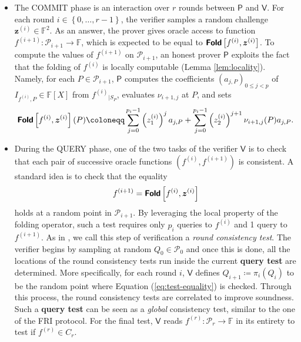 \documentclass[a4paper,USenglish,autoref]{lipics-v2021}
\newcommand\F{\mathbb{F}}
\newcommand\fold[1]{\textsf{\textbf{Fold}}\left[#1\right]}
\def\rest#1#2{{{#1}_{|#2}}}
\newcommand\prover{\mathsf{P}}
\newcommand\verifier{\mathsf{V}}
\renewcommand{\vec}[1]{\boldsymbol{#1}}
\newcommand{\set}[1]{\left\{#1\right\}}
\newcommand{\range}[1]{\set{0,\dots,#1-1}}
\newcommand\bfz{{\vec{z}}}
\newcommand\calP{\mathcal{P}}
\newcommand\mydef{\coloneqq}
\begin{document}
\begin{itemize}
	\item The \textsf{COMMIT} phase 
	is an interaction over $r$ rounds between $\prover$ and $\verifier$. For each round $i \in \range{r}$, the verifier samples a random challenge $\bfz^{(i)} \in \F^2$. As an answer, the prover gives oracle access to function $f^{(i+1)} : \calP_{i+1} \rightarrow \F$, which is expected to be equal to $\fold{f^{(i)}, \bfz^{(i)}}$. To compute the values of $f^{(i+1)}$ on $\calP_{i+1}$, an honest prover $\prover$ exploits the fact that the folding of $f^{(i)}$ is locally computable (Lemma \ref{lem:locality}). Namely, for each $P \in \calP_{i+1}$, $\prover$ computes the coefficients $(a_{j,P})_{0 \le j < p}$ of  $I_{f^{(i)}, P} \in \F[X]$ from $\rest{f^{(i)}}{S_P}$, evaluates $\nu_{i+1,j}$ at $P$, and sets 
	\[
	\fold{f^{(i)}, \bfz^{(i)}}(P) \mydef\sum_{j=0}^{p_i-1} \left(z_1^{(i)}\right)^j a_{j, P} + \sum_{j=0}^{p_i-1} \left(z_2^{(i)}\right)^{j+1} \nu_{i+1,j}(P) a_{j, P}.
	\] 
	\item During the \textsf{QUERY} phase, one of the two tasks of the verifier $\verifier$ is to check that each pair of successive oracle functions $(f^{(i)}, f^{(i+1)})$ is consistent. A standard idea is to check that the equality 
	\begin{equation}\label{eq:test-equality}
		f^{(i+1)} = \fold{f^{(i)}, \bfz^{(i)}}
	\end{equation}
	holds at a random point in $\calP_{i+ 1}$.
	By leveraging the local property of the folding operator, such a test requires only $p_i$ queries to $f^{(i)}$ and 1 query to $f^{(i + 1)}$. As in \cite{BBHR18a}, we call this step of verification a \emph{round consistency test}. The verifier begins by sampling at random $Q_0 \in \calP_0$ and once this is done, all the locations of the round consistency tests run inside the current \textsf{\textbf{query test}} are determined. More specifically, for each round $i$,  $\verifier$ defines $Q_{i+1} \mydef \pi_i(Q_i)$ to be the random point where Equation (\ref{eq:test-equality}) is checked. Through this process, the round consistency tests are correlated to improve soundness. Such a \textsf{\textbf{query test}} can be seen as a \emph{global} consistency test, similar to the one of the \textsf{FRI} protocol. For the final test, $\verifier$ reads $f^{(r)} : \calP_r \rightarrow \F$ in its entirety to test if $f^{(r)} \in C_r$.
\end{itemize}
\end{document}
